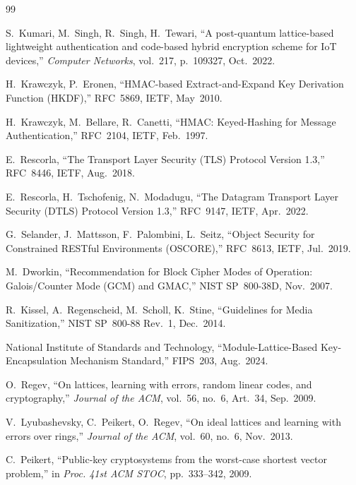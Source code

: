\documentclass[conference]{IEEEtran}
\begin{document}
\begin{thebibliography}{99}

S.~Kumari, M.~Singh, R.~Singh, H.~Tewari,
``A post-quantum lattice-based lightweight authentication and code-based
hybrid encryption scheme for {IoT} devices,''
\textit{Computer Networks}, vol.~217, p.~109327, Oct.~2022.

H.~Krawczyk, P.~Eronen,
``{HMAC}-based Extract-and-Expand Key Derivation Function ({HKDF}),''
RFC~5869, IETF, May~2010.

H.~Krawczyk, M.~Bellare, R.~Canetti,
``{HMAC}: Keyed-Hashing for Message Authentication,''
RFC~2104, IETF, Feb.~1997.

E.~Rescorla,
``The Transport Layer Security ({TLS}) Protocol Version 1.3,''
RFC~8446, IETF, Aug.~2018.

E.~Rescorla, H.~Tschofenig, N.~Modadugu,
``The Datagram Transport Layer Security ({DTLS}) Protocol Version 1.3,''
RFC~9147, IETF, Apr.~2022.

G.~Selander, J.~Mattsson, F.~Palombini, L.~Seitz,
``Object Security for Constrained {RESTful} Environments ({OSCORE}),''
RFC~8613, IETF, Jul.~2019.

M.~Dworkin,
``Recommendation for Block Cipher Modes of Operation: {Galois/Counter Mode
(GCM)} and {GMAC},''
NIST SP~800-38D, Nov.~2007.

R.~Kissel, A.~Regenscheid, M.~Scholl, K.~Stine,
``Guidelines for Media Sanitization,''
NIST SP~800-88 Rev.~1, Dec.~2014.

{National Institute of Standards and Technology},
``Module-Lattice-Based Key-Encapsulation Mechanism Standard,''
FIPS~203, Aug.~2024.

O.~Regev,
``On lattices, learning with errors, random linear codes, and
cryptography,''
\textit{Journal of the ACM}, vol.~56, no.~6, Art.~34, Sep.~2009.

V.~Lyubashevsky, C.~Peikert, O.~Regev,
``On ideal lattices and learning with errors over rings,''
\textit{Journal of the ACM}, vol.~60, no.~6, Nov.~2013.

C.~Peikert,
``Public-key cryptosystems from the worst-case shortest vector problem,''
in \textit{Proc. 41st ACM STOC}, pp.~333--342, 2009.


\end{thebibliography}
\end{document}
